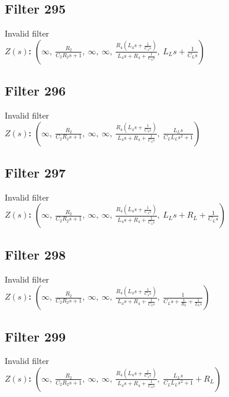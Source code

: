 \documentclass{article}
\begin{document}
\subsection*{Filter 295}
Invalid filter \\ 
\textbf{$Z(s)$:} $\left( \infty, \  \frac{R_{2}}{C_{2} R_{2} s + 1}, \  \infty, \  \infty, \  \frac{R_{4} \left(L_{4} s + \frac{1}{C_{4} s}\right)}{L_{4} s + R_{4} + \frac{1}{C_{4} s}}, \  L_{L} s + \frac{1}{C_{L} s}\right)$ \\ 
\subsection*{Filter 296}
Invalid filter \\ 
\textbf{$Z(s)$:} $\left( \infty, \  \frac{R_{2}}{C_{2} R_{2} s + 1}, \  \infty, \  \infty, \  \frac{R_{4} \left(L_{4} s + \frac{1}{C_{4} s}\right)}{L_{4} s + R_{4} + \frac{1}{C_{4} s}}, \  \frac{L_{L} s}{C_{L} L_{L} s^{2} + 1}\right)$ \\ 
\subsection*{Filter 297}
Invalid filter \\ 
\textbf{$Z(s)$:} $\left( \infty, \  \frac{R_{2}}{C_{2} R_{2} s + 1}, \  \infty, \  \infty, \  \frac{R_{4} \left(L_{4} s + \frac{1}{C_{4} s}\right)}{L_{4} s + R_{4} + \frac{1}{C_{4} s}}, \  L_{L} s + R_{L} + \frac{1}{C_{L} s}\right)$ \\ 
\subsection*{Filter 298}
Invalid filter \\ 
\textbf{$Z(s)$:} $\left( \infty, \  \frac{R_{2}}{C_{2} R_{2} s + 1}, \  \infty, \  \infty, \  \frac{R_{4} \left(L_{4} s + \frac{1}{C_{4} s}\right)}{L_{4} s + R_{4} + \frac{1}{C_{4} s}}, \  \frac{1}{C_{L} s + \frac{1}{R_{L}} + \frac{1}{L_{L} s}}\right)$ \\ 
\subsection*{Filter 299}
Invalid filter \\ 
\textbf{$Z(s)$:} $\left( \infty, \  \frac{R_{2}}{C_{2} R_{2} s + 1}, \  \infty, \  \infty, \  \frac{R_{4} \left(L_{4} s + \frac{1}{C_{4} s}\right)}{L_{4} s + R_{4} + \frac{1}{C_{4} s}}, \  \frac{L_{L} s}{C_{L} L_{L} s^{2} + 1} + R_{L}\right)$ \\ 
\end{document}
